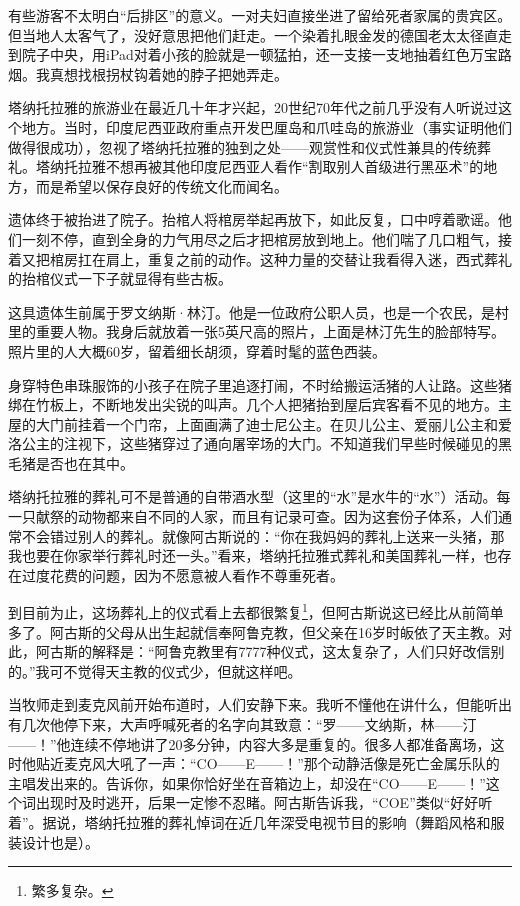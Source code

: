 \documentclass[12pt,oneside]{book}
\begin{document}
\begin{bookref}[frametitle={\cite{好好告别：世界葬礼观察手记}}]
有些游客不太明白“后排区”的意义。一对夫妇直接坐进了留给死者家属的贵宾区。但当地人太客气了，没好意思把他们赶走。一个染着扎眼金发的德国老太太径直走到院子中央，用iPad对着小孩的脸就是一顿猛拍，还一支接一支地抽着红色万宝路烟。我真想找根拐杖钩着她的脖子把她弄走。

塔纳托拉雅的旅游业在最近几十年才兴起，20世纪70年代之前几乎没有人听说过这个地方。当时，印度尼西亚政府重点开发巴厘岛和爪哇岛的旅游业（事实证明他们做得很成功），忽视了塔纳托拉雅的独到之处——观赏性和仪式性兼具的传统葬礼。塔纳托拉雅不想再被其他印度尼西亚人看作“割取别人首级进行黑巫术”的地方，而是希望以保存良好的传统文化而闻名。

遗体终于被抬进了院子。抬棺人将棺房举起再放下，如此反复，口中哼着歌谣。他们一刻不停，直到全身的力气用尽之后才把棺房放到地上。他们喘了几口粗气，接着又把棺房扛在肩上，重复之前的动作。这种力量的交替让我看得入迷，西式葬礼的抬棺仪式一下子就显得有些古板。

这具遗体生前属于罗文纳斯·林汀。他是一位政府公职人员，也是一个农民，是村里的重要人物。我身后就放着一张5英尺高的照片，上面是林汀先生的脸部特写。照片里的人大概60岁，留着细长胡须，穿着时髦的蓝色西装。

身穿特色串珠服饰的小孩子在院子里追逐打闹，不时给搬运活猪的人让路。这些猪绑在竹板上，不断地发出尖锐的叫声。几个人把猪抬到屋后宾客看不见的地方。主屋的大门前挂着一个门帘，上面画满了迪士尼公主。在贝儿公主、爱丽儿公主和爱洛公主的注视下，这些猪穿过了通向屠宰场的大门。不知道我们早些时候碰见的黑毛猪是否也在其中。

塔纳托拉雅的葬礼可不是普通的自带酒水型（这里的“水”是水牛的“水”）活动。每一只献祭的动物都来自不同的人家，而且有记录可查。因为这套份子体系，人们通常不会错过别人的葬礼。就像阿古斯说的：“你在我妈妈的葬礼上送来一头猪，那我也要在你家举行葬礼时还一头。”看来，塔纳托拉雅式葬礼和美国葬礼一样，也存在过度花费的问题，因为不愿意被人看作不尊重死者。

到目前为止，这场葬礼上的仪式看上去都很繁复\footnote{繁多复杂。}，但阿古斯说这已经比从前简单多了。阿古斯的父母从出生起就信奉阿鲁克教，但父亲在16岁时皈依了天主教。对此，阿古斯的解释是：“阿鲁克教里有7777种仪式，这太复杂了，人们只好改信别的。”我可不觉得天主教的仪式少，但就这样吧。

当牧师走到麦克风前开始布道时，人们安静下来。我听不懂他在讲什么，但能听出有几次他停下来，大声呼喊死者的名字向其致意：“罗——文纳斯，林——汀——！”他连续不停地讲了20多分钟，内容大多是重复的。很多人都准备离场，这时他贴近麦克风大吼了一声：“CO——E——！”那个动静活像是死亡金属乐队的主唱发出来的。告诉你，如果你恰好坐在音箱边上，却没在“CO——E——！”这个词出现时及时逃开，后果一定惨不忍睹。阿古斯告诉我，“COE”类似“好好听着”。据说，塔纳托拉雅的葬礼悼词在近几年深受电视节目的影响（舞蹈风格和服装设计也是）。


\end{bookref}
\end{document}
